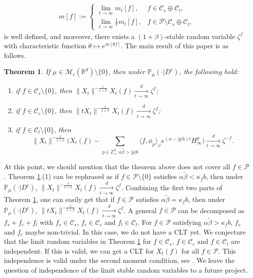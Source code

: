 \documentclass[12pt,a4paper]{amsart}
\theoremstyle{plain}
\newtheorem{thm}{Theorem}[section]
\theoremstyle{definition}
\numberwithin{equation}{section}
\begin{document}
\begin{align}
  \label{eq:I:R:3}
  m[f]
  := \begin{cases}
    \lim_{t\to \infty} m_t[f], &
    f \in \mathcal C_s \oplus \mathcal C_l, \\
    \lim_{t\to \infty} \frac{1}{t} m_t[f], & f\in \mathcal P \setminus \mathcal C_s \oplus \mathcal C_l,
  \end{cases}
\end{align}
is well defined, and moreover, there exists a $(1+\beta)$-stable random variable $\zeta^f$ with characteristic function $\theta \mapsto e^{m[\theta f]}$.
The main result of this paper is as follows.

\begin{thm}
  \label{thm:M}
 If $\mu\in \mathcal M_c(\mathbb R^d)\setminus \{0\}$, then under $\mathbb{P}_{\mu}(\cdot|D^c)$, the following hold:
\begin{enumerate}
\item
  \label{thm:M:1}
  if $f\in \mathcal C_s\setminus\{0\}$, then $\|X_t\|^{- \frac{1}{1+\beta}} X_t(f)  \xrightarrow[t\to \infty]{d} \zeta^f$;
\item
  \label{thm:M:2}
  if $f\in \mathcal C_c\setminus\{0\}$, then $ \|t X_t\|^{-\frac{1}{1+\beta}} X_t(f) \xrightarrow[t\to \infty]{d} \zeta^f$;
\item
  \label{thm:M:3}
  if $f\in \mathcal C_l\setminus\{0\}$, then
  \[
    \|X_t\|^{-\frac{1}{1+\beta}} \Big( X_t(f) - \sum_{p\in \mathbb Z^d_+:\alpha \tilde \beta>|p|b}\langle f,\phi_p\rangle_\varphi e^{(\alpha-|p|b)t}H^p_{\infty}\Big)
    \xrightarrow[t\to \infty]{d}
    \zeta^{-f}.
  \]
\end{enumerate}
\end{thm}


At this point, we should mention that the theorem above does not cover all $f\in \mathcal P$.
Theorem \ref{thm:M}.(1) can be rephrased as if $f\in \mathcal P\setminus\{0\}$ satisfies   $\alpha \tilde \beta < \kappa_f b$, then  under $\mathbb{P}_{\mu}(\cdot|D^c)$, $\|X_t\|^{- \frac{1}{1+\beta}} X_t(f)  \xrightarrow[t\to \infty]{d} \zeta^f$.
Combining the first two parts of Theorem \ref{thm:M}, one can easily get that  if $f\in \mathcal P$ satisfies   $\alpha \tilde \beta = \kappa_f b$, then  under $\mathbb{P}_{\mu}(\cdot|D^c)$,
$ \|t X_t\|^{-\frac{1}{1+\beta}} X_t(f) \xrightarrow[t\to \infty]{d} \zeta^f$.
A general  $f \in \mathcal P$ can be decomposed as $f_s + f_c + f_l$ with $f_s \in \mathcal C_s$, $f_c \in \mathcal C_c$ and $f_l \in \mathcal C_l$. 
For $f\in  \mathcal P$ satisfying $\alpha \tilde \beta > \kappa_f b$, $f_s$ and $f_c$ maybe non-trivial.
In this case, we do not have a CLT yet.
We conjecture that the limit random variables in Theorem \ref{thm:M} for $ f\in \mathcal C_s$, $f\in \mathcal C_c$ and $ f\in \mathcal C_l$ are independent. If this is valid, we can
get a CLT for $ X_t(f)$ for all $f\in  \mathcal P$.
This independence is valid  under the second moment condition, see \cite{RenSongZhang2015Central}.
We leave the question of independence of the limit stable random variables to a future project.
\end{document}
